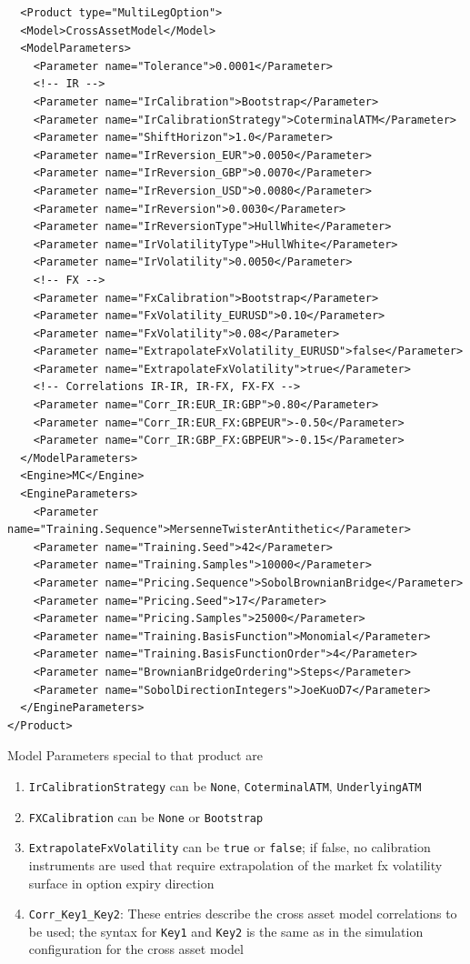 \begin{verbatim}
  <Product type="MultiLegOption">
  <Model>CrossAssetModel</Model>
  <ModelParameters>
    <Parameter name="Tolerance">0.0001</Parameter>
    <!-- IR -->
    <Parameter name="IrCalibration">Bootstrap</Parameter>
    <Parameter name="IrCalibrationStrategy">CoterminalATM</Parameter>
    <Parameter name="ShiftHorizon">1.0</Parameter>
    <Parameter name="IrReversion_EUR">0.0050</Parameter>
    <Parameter name="IrReversion_GBP">0.0070</Parameter>
    <Parameter name="IrReversion_USD">0.0080</Parameter>
    <Parameter name="IrReversion">0.0030</Parameter>
    <Parameter name="IrReversionType">HullWhite</Parameter>
    <Parameter name="IrVolatilityType">HullWhite</Parameter>
    <Parameter name="IrVolatility">0.0050</Parameter>
    <!-- FX -->
    <Parameter name="FxCalibration">Bootstrap</Parameter>
    <Parameter name="FxVolatility_EURUSD">0.10</Parameter>
    <Parameter name="FxVolatility">0.08</Parameter>
    <Parameter name="ExtrapolateFxVolatility_EURUSD">false</Parameter>
    <Parameter name="ExtrapolateFxVolatility">true</Parameter>
    <!-- Correlations IR-IR, IR-FX, FX-FX -->
    <Parameter name="Corr_IR:EUR_IR:GBP">0.80</Parameter>
    <Parameter name="Corr_IR:EUR_FX:GBPEUR">-0.50</Parameter>
    <Parameter name="Corr_IR:GBP_FX:GBPEUR">-0.15</Parameter>
  </ModelParameters>
  <Engine>MC</Engine>
  <EngineParameters>
    <Parameter name="Training.Sequence">MersenneTwisterAntithetic</Parameter>
    <Parameter name="Training.Seed">42</Parameter>
    <Parameter name="Training.Samples">10000</Parameter>
    <Parameter name="Pricing.Sequence">SobolBrownianBridge</Parameter>
    <Parameter name="Pricing.Seed">17</Parameter>
    <Parameter name="Pricing.Samples">25000</Parameter>
    <Parameter name="Training.BasisFunction">Monomial</Parameter>
    <Parameter name="Training.BasisFunctionOrder">4</Parameter>
    <Parameter name="BrownianBridgeOrdering">Steps</Parameter>
    <Parameter name="SobolDirectionIntegers">JoeKuoD7</Parameter>
  </EngineParameters>
</Product>
\end{verbatim}

Model Parameters special to that product are

\begin{enumerate}
\item \verb+IrCalibrationStrategy+ can be \verb+None+, \verb+CoterminalATM+, \verb+UnderlyingATM+
\item \verb+FXCalibration+ can be \verb+None+ or \verb+Bootstrap+
\item \verb+ExtrapolateFxVolatility+ can be \verb+true+ or \verb+false+; if false, no calibration instruments are used
  that require extrapolation of the market fx volatility surface in option expiry direction
\item \verb+Corr_Key1_Key2+: These entries describe the cross asset model correlations to be used; the syntax for
  \verb+Key1+ and \verb+Key2+ is the same as in the simulation configuration for the cross asset model
\end{enumerate}


